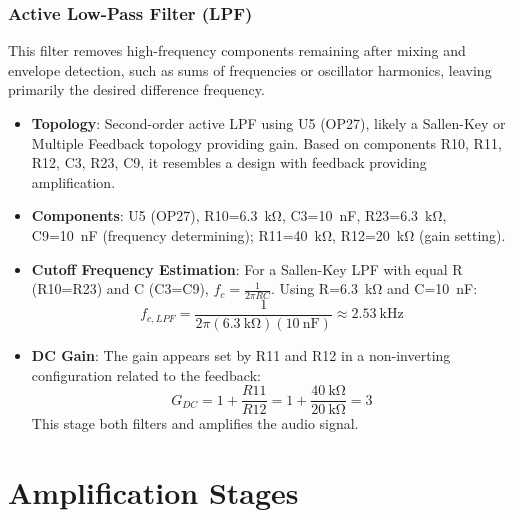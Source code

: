 \documentclass[conference]{IEEEtran}
\begin{document}
\subsubsection{Active Low-Pass Filter (LPF)}
This filter removes high-frequency components remaining after mixing and envelope detection, such as sums of frequencies or oscillator harmonics, leaving primarily the desired difference frequency.
\begin{itemize}
    \item \textbf{Topology}: Second-order active LPF using U5 (OP27), likely a Sallen-Key or Multiple Feedback topology providing gain. Based on components R10, R11, R12, C3, R23, C9, it resembles a design with feedback providing amplification.
    \item \textbf{Components}: U5 (OP27), R10=\SI{6.3}{\kilo\ohm}, C3=\SI{10}{\nano\farad}, R23=\SI{6.3}{\kilo\ohm}, C9=\SI{10}{\nano\farad} (frequency determining); R11=\SI{40}{\kilo\ohm}, R12=\SI{20}{\kilo\ohm} (gain setting).
    \item \textbf{Cutoff Frequency Estimation}: For a Sallen-Key LPF with equal R (R10=R23) and C (C3=C9), $f_c = \frac{1}{2\pi RC}$. Using R=\SI{6.3}{\kilo\ohm} and C=\SI{10}{\nano\farad}:
        \begin{equation}
            f_{c, LPF} = \frac{1}{2\pi (\SI{6.3}{\kilo\ohm})(\SI{10}{\nano\farad})} \approx \SI{2.53}{\kilo\hertz}
        \end{equation}
    \item \textbf{DC Gain}: The gain appears set by R11 and R12 in a non-inverting configuration related to the feedback:
        \begin{equation}
             G_{DC} = 1 + \frac{R11}{R12} = 1 + \frac{\SI{40}{\kilo\ohm}}{\SI{20}{\kilo\ohm}} = 3
        \end{equation}
        This stage both filters and amplifies the audio signal.
\end{itemize}

\section{Amplification Stages}
\end{document}

